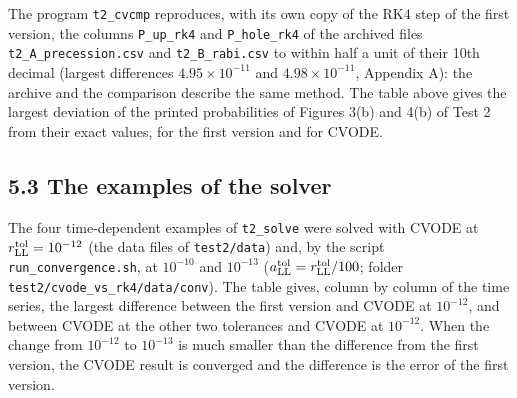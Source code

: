 \documentclass[
  10pt,
]{article}
\begin{document}
The program \texttt{t2\_cvcmp} reproduces, with its own copy of the RK4
step of the first version, the columns \texttt{P\_up\_rk4} and
\texttt{P\_hole\_rk4} of the archived files
\texttt{t2\_A\_precession.csv} and \texttt{t2\_B\_rabi.csv} to within
half a unit of their 10th decimal (largest differences
\(4.95\times10^{-11}\) and \(4.98\times10^{-11}\), Appendix A): the
archive and the comparison describe the same method. The table above
gives the largest deviation of the printed probabilities of Figures 3(b)
and 4(b) of Test 2 from their exact values, for the first version and
for CVODE.

\hypertarget{the-examples-of-the-solver}{%
\subsection{5.3 The examples of the
solver}\label{the-examples-of-the-solver}}

The four time-dependent examples of \texttt{t2\_solve} were solved with
CVODE at \(r^{\rm tol}_{\rm LL}=10^{-12}\) (the data files of
\texttt{test2/data}) and, by the script \texttt{run\_convergence.sh}, at
\(10^{-10}\) and \(10^{-13}\)
(\(a^{\rm tol}_{\rm LL}=r^{\rm tol}_{\rm LL}/100\); folder
\texttt{test2/cvode\_vs\_rk4/data/conv}). The table gives, column by
column of the time series, the largest difference between the first
version and CVODE at \(10^{-12}\), and between CVODE at the other two
tolerances and CVODE at \(10^{-12}\). When the change from \(10^{-12}\)
to \(10^{-13}\) is much smaller than the difference from the first
version, the CVODE result is converged and the difference is the error
of the first version.
\end{document}
